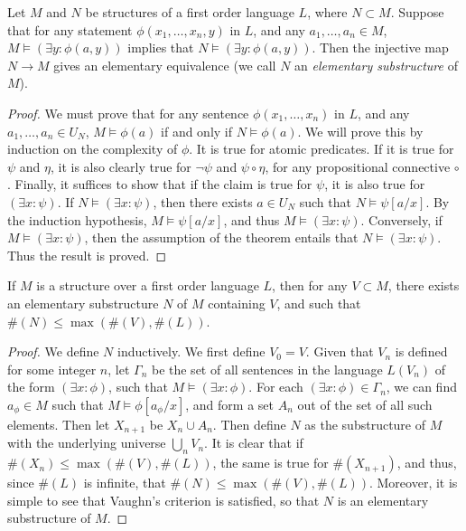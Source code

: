 \begin{theorem}
    Let $M$ and $N$ be structures of a first order language $L$, where $N \subset M$. Suppose that for any statement $\phi(x_1,\dots,x_n,y)$ in $L$, and any $a_1,\dots,a_n \in M$, $M \vDash (\exists y: \phi(a,y))$ implies that $N \vDash (\exists y: \phi(a,y))$. Then the injective map $N \to M$ gives an elementary equivalence (we call $N$ an \emph{elementary substructure} of $M$).
\end{theorem}
\begin{proof}
    We must prove that for any sentence $\phi(x_1,\dots,x_n)$ in $L$, and any $a_1,\dots,a_n \in U_N$, $M \vDash \phi(a)$ if and only if $N \vDash \phi(a)$. We will prove this by induction on the complexity of $\phi$. It is true for atomic predicates. If it is true for $\psi$ and $\eta$, it is also clearly true for $\neg \psi$ and $\psi \circ \eta$, for any propositional connective $\circ$. Finally, it suffices to show that if the claim is true for $\psi$, it is also true for $(\exists x: \psi)$. If $N \vDash (\exists x: \psi)$, then there exists $a \in U_N$ such that $N \vDash \psi[a/x]$. By the induction hypothesis, $M \vDash \psi[a/x]$, and thus $M \vDash (\exists x: \psi)$. Conversely, if $M \vDash (\exists x: \psi)$, then the assumption of the theorem entails that $N \vDash (\exists x: \psi)$. Thus the result is proved.
\end{proof}

\begin{theorem}
    If $M$ is a structure over a first order language $L$, then for any $V \subset M$, there exists an elementary substructure $N$ of $M$ containing $V$, and such that $\#(N) \leq \max(\#(V), \#(L))$.
\end{theorem}
\begin{proof}
    We define $N$ inductively. We first define $V_0 = V$. Given that $V_n$ is defined for some integer $n$, let $\Gamma_n$ be the set of all sentences in the language $L(V_n)$ of the form $(\exists x: \phi)$, such that $M \vDash (\exists x: \phi)$. For each $(\exists x: \phi) \in \Gamma_n$, we can find $a_\phi \in M$ such that $M \vDash \phi[a_\phi / x]$, and form a set $A_n$ out of the set of all such elements. Then let $X_{n + 1}$ be $X_n \cup A_n$. Then define $N$ as the substructure of $M$ with the underlying universe $\bigcup_n V_n$. It is clear that if $\#(X_n) \leq \max(\#(V), \#(L))$, the same is true for $\#(X_{n+1})$, and thus, since $\#(L)$ is infinite, that $\#(N) \leq \max(\#(V), \#(L))$. Moreover, it is simple to see that Vaughn's criterion is satisfied, so that $N$ is an elementary substructure of $M$.
\end{proof}

